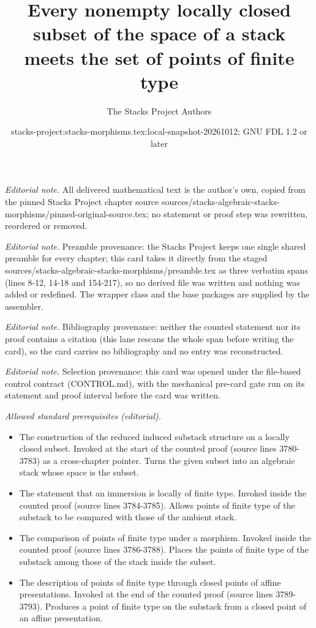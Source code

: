 \documentclass[10pt,a4paper]{amsart}
\title{Every nonempty locally closed subset of the space of a stack meets the set of points of finite type}
\author{The Stacks Project Authors}
\date{stacks-project:stacks-morphisms.tex:local-snapshot-20261012; GNU FDL 1.2 or later}
\theoremstyle{plain}
\theoremstyle{definition}
\theoremstyle{remark}
\numberwithin{equation}{subsection}
\begin{document}
\maketitle
\noindent\textit{Editorial note.} All delivered mathematical text is the author's own, copied from the pinned Stacks Project chapter source sources/stacks-algebraic-stacks-morphisms/pinned-original-source.tex; no statement or proof step was rewritten, reordered or removed.\par\medskip
\noindent\textit{Editorial note.} Preamble provenance: the Stacks Project keeps one single shared preamble for every chapter; this card takes it directly from the staged sources/stacks-algebraic-stacks-morphisms/preamble.tex as three verbatim spans (lines 8-12, 14-18 and 154-217), so no derived file was written and nothing was added or redefined. The wrapper class and the base packages are supplied by the assembler.\par\medskip
\noindent\textit{Editorial note.} Bibliography provenance: neither the counted statement nor its proof contains a citation (this lane rescans the whole span before writing the card), so the card carries no bibliography and no entry was reconstructed.\par\medskip
\noindent\textit{Editorial note.} Selection provenance: this card was opened under the file-based control contract (CONTROL.md), with the mechanical pre-card gate run on its statement and proof interval before the card was written.\par\medskip
\noindent\textit{Allowed standard prerequisites (editorial).}\begin{itemize}
\item The construction of the reduced induced substack structure on a locally closed subset. Invoked at the start of the counted proof (source lines 3780-3783) as a cross-chapter pointer. Turns the given subset into an algebraic stack whose space is the subset.
\item The statement that an immersion is locally of finite type. Invoked inside the counted proof (source lines 3784-3785). Allows points of finite type of the substack to be compared with those of the ambient stack.
\item The comparison of points of finite type under a morphism. Invoked inside the counted proof (source lines 3786-3788). Places the points of finite type of the substack among those of the stack inside the subset.
\item The description of points of finite type through closed points of affine presentations. Invoked at the end of the counted proof (source lines 3789-3793). Produces a point of finite type on the substack from a closed point of an affine presentation.
\end{itemize}\medskip
\end{document}
